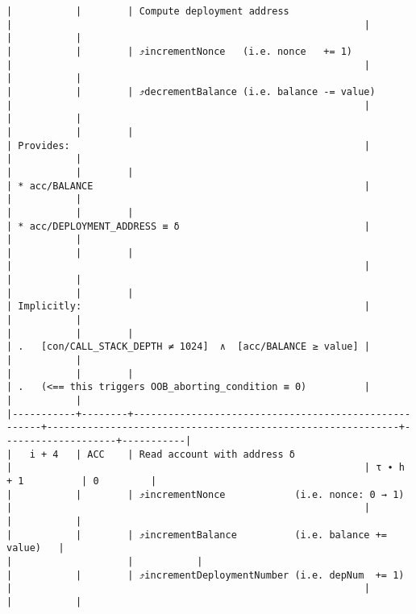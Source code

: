 \documentclass[varwidth=\maxdimen,margin=0.5cm,multi={verbatim}]{standalone}
\begin{document}
\begin{verbatim}
|           |        | Compute deployment address                           |                                                             |                    |           |
|           |        | ⤴️incrementNonce   (i.e. nonce   += 1)                |                                                             |                    |           |
|           |        | ⤴️decrementBalance (i.e. balance -= value)            |                                                             |                    |           |
|           |        |                                                      | Provides:                                                   |                    |           |
|           |        |                                                      | * acc/BALANCE                                               |                    |           |
|           |        |                                                      | * acc/DEPLOYMENT_ADDRESS ≡ δ                                |                    |           |
|           |        |                                                      |                                                             |                    |           |
|           |        |                                                      | Implicitly:                                                 |                    |           |
|           |        |                                                      | .   [con/CALL_STACK_DEPTH ≠ 1024]  ∧  [acc/BALANCE ≥ value] |                    |           |
|           |        |                                                      | .   (<== this triggers OOB_aborting_condition ≡ 0)          |                    |           |
|-----------+--------+------------------------------------------------------+-------------------------------------------------------------+--------------------+-----------|
|   i + 4   | ACC    | Read account with address δ                          |                                                             | τ ∙ h + 1          | 0         |
|           |        | ⤴️incrementNonce            (i.e. nonce: 0 → 1)       |                                                             |                    |           |
|           |        | ⤴️incrementBalance          (i.e. balance += value)   |                                                             |                    |           |
|           |        | ⤴️incrementDeploymentNumber (i.e. depNum  += 1)       |                                                             |                    |           |

\end{verbatim}
\end{document}
